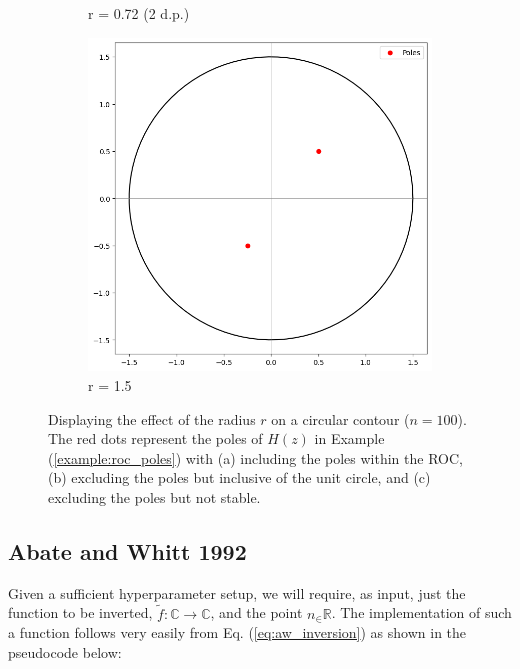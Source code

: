 \documentclass[a4paper]{report}
\begin{document}
\begin{figure}[H]
\begin{subfigure}{.25\linewidth}
      \caption{r = 0.72 (2 d.p.)}
      \label{fig:valid_r}
    \end{subfigure}\hfill
    \begin{subfigure}{.25\linewidth}
      \includegraphics[width=\linewidth]{images/unstable_contour.png}
      \caption{r = 1.5}
    \end{subfigure}\hfill
    
    \caption{ Displaying the effect of the radius $r$ on a circular contour ($n = 100$). The red dots represent the poles of $H(z)$ in Example (\ref{example:roc_poles}) with (a) including the poles within the ROC, (b) excluding the poles but inclusive of the unit circle, and (c) excluding the poles but not stable.}
    \label{fig:effect_r}
\end{figure}

\subsection{Abate and Whitt 1992}
Given a sufficient hyperparameter setup, we will require, as input,  just the function to be inverted, $\tilde{f}: \mathbb{C}\rightarrow \mathbb{C}$, and the point $n_\in \mathbb{R}$. The implementation of such a function follows very easily from Eq. (\ref{eq:aw_inversion}) as shown in the pseudocode below:
\end{document}
